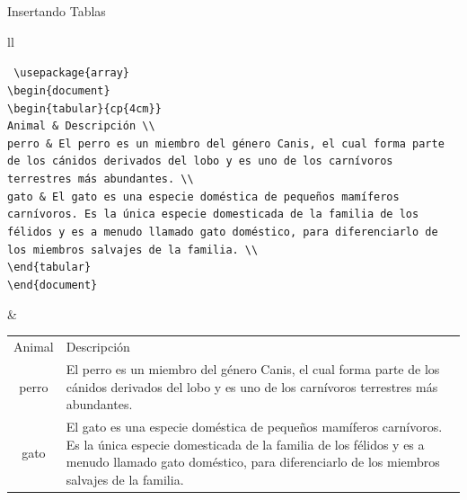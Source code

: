 \documentclass[12pt]{beamer}
\begin{document}
\begin{frame}{Insertando Tablas}
    \begin{center}
      \scriptsize
      \begin{tabular}{ll} 
      \begin{minipage}{0.5\textwidth}
        \begin{block}{}
          \texttt{\color{blue}
            \textbackslash usepackage\{array\}\\
            \textbackslash begin\{document\}\\
            \textbackslash begin\{tabular\}\{cp\{4cm\}\}\\          
            Animal  \& Descripción \textbackslash\textbackslash\\
            perro   \& El perro es un miembro del género Canis, el cual forma parte 
            de los cánidos derivados del lobo y es uno de los carnívoros terrestres 
        más abundantes. \textbackslash\textbackslash\\
            gato \& El gato es una especie doméstica de pequeños mamíferos carnívoros. Es la única especie domesticada de la familia de los félidos y es a menudo llamado gato doméstico, para diferenciarlo de los miembros salvajes de la familia. \textbackslash\textbackslash\\
            \textbackslash end\{tabular\}\\
            \textbackslash end\{document\}
          }
        \end{block}
      \end{minipage} &
      \begin{minipage}{0.5\textwidth}
        \begin{tabular}{cp{4cm}}
          Animal & Descripción \\
          perro  & El perro es un miembro del género Canis, el cual forma parte 
                  de los cánidos derivados del lobo y es uno de los carnívoros terrestres 
              más abundantes. \\
          gato   & El gato es una especie doméstica de pequeños mamíferos carnívoros. Es la única especie domesticada de la familia de los félidos y es a menudo llamado gato doméstico, para diferenciarlo de los miembros salvajes de la familia. \\
        \end{tabular}
      \end{minipage}
      \end{tabular}
    \end{center}
\end{frame}
\end{document}
